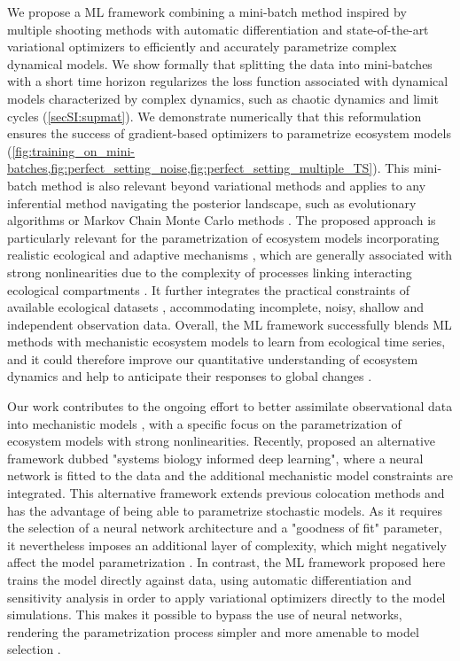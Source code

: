 We propose a ML framework combining a mini-batch method inspired by multiple shooting methods \cite{Pisarenko2004} with automatic differentiation \cite{Rackauckas2020a} and state-of-the-art variational optimizers \cite{Kingma2014} to efficiently and accurately parametrize complex dynamical models. 
% 
We show formally that splitting the data into mini-batches with a short time horizon regularizes the loss function associated with dynamical models characterized by complex dynamics, such as chaotic dynamics and limit cycles (\cref{secSI:supmat}). We demonstrate numerically that this reformulation ensures the success of gradient-based optimizers to parametrize ecosystem models (\cref{fig:training_on_mini-batches,fig:perfect_setting_noise,fig:perfect_setting_multiple_TS}).
% 
This mini-batch method is also relevant beyond variational methods and applies to any inferential method navigating the posterior landscape, such as evolutionary algorithms \cite{wilke2001evolution,Rodriguez-Fernandez2006} or Markov Chain Monte Carlo methods \cite{Lignell2013,Higgins2010,Xu2006,Fiechter2013,Rosenbaum2019}.
% 
The proposed approach is particularly relevant for the parametrization of ecosystem models incorporating realistic ecological and adaptive mechanisms \cite{Urban2016}, which are generally associated with strong nonlinearities due to the complexity of processes linking interacting ecological compartments \cite{Bjornstad2001,Hastings1993,Huisman1999,Beninca2008}. It further integrates the practical constraints of available ecological datasets \cite{Dornelas2018}, accommodating incomplete, noisy, shallow and independent observation data.
Overall, the ML framework successfully blends ML methods with mechanistic ecosystem models to learn from ecological time series, and it could therefore improve our quantitative understanding of ecosystem dynamics and help to anticipate their responses to global changes \cite{Urban2016}.

Our work contributes to the ongoing effort to better assimilate observational data into mechanistic models \cite{Schartau2017,Raissi2019,Kashinath2021}, with a specific focus on the parametrization of ecosystem models with strong nonlinearities.
%
Recently, \cite{Yazdani2020} proposed an alternative framework dubbed "systems biology informed deep learning", where a neural network is fitted to the data and the additional mechanistic model constraints are integrated. This alternative framework extends previous colocation methods \cite{Ramsay2007,Cao2008} and has the advantage of being able to parametrize stochastic models. As it requires the selection of a neural network architecture and a "goodness of fit" parameter, it nevertheless imposes an additional layer of complexity, which might negatively affect the model parametrization  \cite{Yazdani2020}. 
% 
In contrast, the ML framework proposed here trains the model directly against data, using automatic differentiation and sensitivity analysis in order to apply variational optimizers directly to the model simulations. This makes it possible to bypass the use of neural networks, rendering the parametrization process simpler and more amenable to model selection \cite{Ramsay2007}. 
% 

